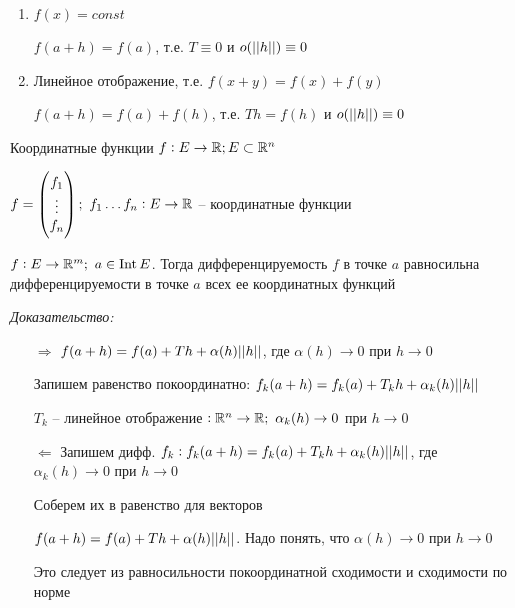 \documentclass[12pt]{article}
\begin{document}
\begin{Example}{}
    \begin{enumerate}
        \item $f(x) = const$
        
        $f(a + h) = f(a)$, т.е. $T \equiv 0$ и $o(|| h ||) \equiv 0$

        \item Линейное отображение, т.е. $f(x + y) = f(x) + f(y)$
        
        $f(a + h) = f(a) + f(h)$, т.е. $Th = f(h)$ и $o(|| h ||) \equiv 0$
    \end{enumerate}
\end{Example}

\begin{defin}{Координатные функции}
    $f : E \to \mathbb R; E \subset \mathbb R^n$

    $f = \begin{pmatrix}
        f_1 \\
        \vdots \\
        f_n 
    \end{pmatrix};\ f_1 \ldots f_n : E \to \mathbb R$ -- координатные функции
\end{defin}

\begin{theo}{}
    $f : E \to \mathbb R^m;\ a \in \operatorname{Int} E$. Тогда дифференцируемость $f$ в точке $a$ равносильна дифференцируемости в точке $a$ всех ее координатных функций
\end{theo}

\textit{Доказательство:}

\begin{itemize}
    \item[$\Rightarrow$] $f(a + h) = f(a) + Th + \alpha(h)|| h ||$, где $\alpha(h) \to 0$ при $h \to 0$
    
    Запишем равенство покоординатно: $f_k(a + h) = f_k(a) + T_kh + \alpha_k(h)|| h ||$

    $T_k$ -- линейное отображение $: \R^n \to \R;\ \alpha_k(h) \to 0$ при $h \to 0$

    \item[$\Leftarrow$] Запишем дифф. $f_k : f_k(a + h) = f_k(a) + T_kh + \alpha_k(h)|| h ||$, где $\alpha_k(h) \to 0$ при $h \to 0$
    
    Соберем их в равенство для векторов

    $f(a + h) = f(a) + Th + \alpha(h)|| h ||$. Надо понять, что $\alpha(h) \to 0$ при $h \to 0$

    Это следует из равносильности покоординатной сходимости и сходимости по норме 
\end{itemize}
\end{document}
